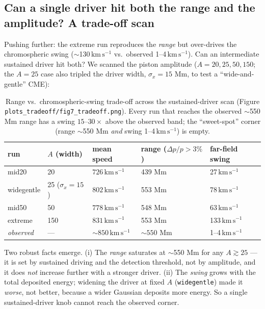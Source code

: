 \documentclass[11pt,a4paper]{article}
\newcommand{\kms}{\,\mathrm{km\,s^{-1}}}
\begin{document}
\subsection{Can a single driver hit both the range and the amplitude? A trade-off scan}

Pushing further: the extreme run reproduces the \emph{range} but over-drives the
chromospheric swing ($\sim$130$\kms$ vs.\ observed 1--4$\kms$). Can an intermediate
sustained driver hit both? We scanned the piston amplitude ($A=20,25,50,150$; the $A=25$
case also tripled the driver width, $\sigma_x=15$ Mm, to test a ``wide-and-gentle'' CME):

\begin{table}[h]\centering
\begin{tabular}{lllll}
\toprule
run & $A$ (width) & mean speed & range ($\Delta p/p>3\%$) & far-field swing\\
\midrule
mid20      & 20            & $726\kms$ & 439 Mm & 27$\kms$\\
widegentle & 25 ($\sigma_x{=}15$) & $802\kms$ & 553 Mm & 78$\kms$\\
mid50      & 50            & $778\kms$ & 548 Mm & 63$\kms$\\
extreme    & 150           & $831\kms$ & 553 Mm & 133$\kms$\\
\midrule
\emph{observed} \cite{Bala2010} & --- & $\sim850\kms$ & $\sim550$ Mm & 1--4$\kms$\\
\bottomrule
\end{tabular}
\caption{Range vs.\ chromospheric-swing trade-off across the sustained-driver scan
(Figure \texttt{plots\_tradeoff/fig7\_tradeoff.png}). Every run that reaches the observed
$\sim$550 Mm range has a swing $15$--$30\times$ above the observed band; the
``sweet-spot'' corner (range $\sim$550 Mm \emph{and} swing 1--4$\kms$) is empty.}
\end{table}

\noindent Two robust facts emerge. (i) The \emph{range} saturates at $\sim$550 Mm for any
$A\gtrsim25$ --- it is set by sustained driving and the detection threshold, not by
amplitude, and it does \emph{not} increase further with a stronger driver. (ii) The
\emph{swing} grows with the total deposited energy; widening the driver at fixed $A$
(\texttt{widegentle}) made it \emph{worse}, not better, because a wider Gaussian deposits
more energy. So a single sustained-driver knob cannot reach the observed corner.
\end{document}
